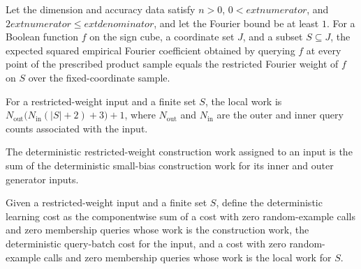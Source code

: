 \begin{theorem}
\label{FABL.deterministicRestrictedWeightEstimateFromOracle_eq}
\leanok
{}
Let the dimension and accuracy data satisfy $n>0$, $0<	ext{numerator}$, and $2	ext{
numerator}\le	ext{denominator}$, and let the Fourier bound be at least $1$. For a
Boolean function $f$ on the sign cube, a coordinate set $J$, and a subset $S\subseteq
J$, the expected squared empirical Fourier coefficient obtained by querying $f$ at every
point of the prescribed product sample equals the restricted Fourier weight of $f$ on
$S$ over the fixed-coordinate sample.
\end{theorem}

\begin{definition}
\label{FABL.deterministicRestrictedWeightLocalWork}
\leanok
{}
For a restricted-weight input and a finite set $S$, the local work is
$N_{\mathrm{out}}\bigl(N_{\mathrm{in}}(|S|+2)+3\bigr)+1$, where $N_{\mathrm{out}}$ and
$N_{\mathrm{in}}$ are the outer and inner query counts associated with the input.
\end{definition}

\begin{definition}
\label{FABL.deterministicRestrictedWeightConstructionWork}
\leanok
{}
The deterministic restricted-weight construction work assigned to an input is the sum of
the deterministic small-bias construction work for its inner and outer generator inputs.
\end{definition}

\begin{definition}
\label{FABL.deterministicRestrictedWeightCost}
\leanok
{}
Given a restricted-weight input and a finite set $S$, define the deterministic learning
cost as the componentwise sum of a cost with zero random-example calls and zero
membership queries whose work is the construction work, the deterministic query-batch
cost for the input, and a cost with zero random-example calls and zero membership
queries whose work is the local work for $S$.
\end{definition}

